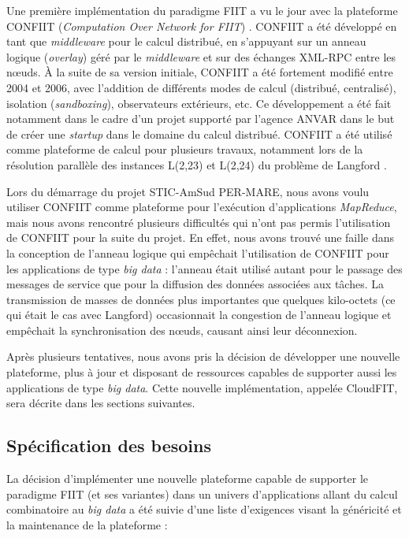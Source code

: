 Une première implémentation du paradigme FIIT a vu le jour avec la plateforme CONFIIT (\textit{Computation Over Network for FIIT}) \cite{FKF03,Flauzac10}. CONFIIT a été développé en tant que \textit{middleware} pour le calcul distribué, en s'appuyant sur un anneau logique (\textit{overlay}) géré par le \textit{middleware} et sur des échanges XML-RPC entre les n{\oe}uds. À la suite de sa version initiale, CONFIIT a été fortement modifié entre 2004 et 2006, avec l'addition de différents modes de calcul (distribué, centralisé), isolation (\textit{sandboxing}), observateurs extérieurs, etc. Ce développement a été fait notamment dans le cadre d'un projet supporté par l'agence ANVAR dans le but de créer une \textit{startup} dans le domaine du calcul distribué.
CONFIIT a été utilisé comme plateforme de calcul pour plusieurs travaux, notamment lors de la résolution parallèle des instances L(2,23) et L(2,24) du problème de Langford \cite{JK04}.

Lors du démarrage du projet STIC-AmSud PER-MARE, nous avons voulu utiliser CONFIIT comme plateforme pour l'exécution d'applications \textit{MapReduce}, mais nous avons rencontré plusieurs difficultés qui n'ont pas permis l'utilisation de CONFIIT pour la suite du projet. En effet, nous avons trouvé une faille dans la conception de l'anneau logique qui empêchait l'utilisation de CONFIIT pour les applications de type \textit{big data} : l'anneau était utilisé autant pour le passage des messages de service que pour la diffusion des données associées aux tâches. La transmission de masses de données plus importantes que quelques kilo-octets (ce qui était le cas avec Langford) occasionnait la congestion de l'anneau logique et empêchait la synchronisation des n{\oe}uds, causant ainsi leur déconnexion.

Après plusieurs tentatives, nous avons pris la décision de développer une nouvelle plateforme, plus à jour et disposant de ressources capables de supporter aussi les applications de type \textit{big data}. Cette nouvelle implémentation, appelée CloudFIT, sera décrite dans les sections suivantes. 


\subsection{Spécification des besoins}

La décision d'implémenter une nouvelle plateforme capable de supporter le paradigme FIIT (et ses variantes) dans un univers d'applications allant du calcul combinatoire au \textit{big data} a été suivie d'une liste d'exigences visant la généricité et la maintenance de la plateforme :

